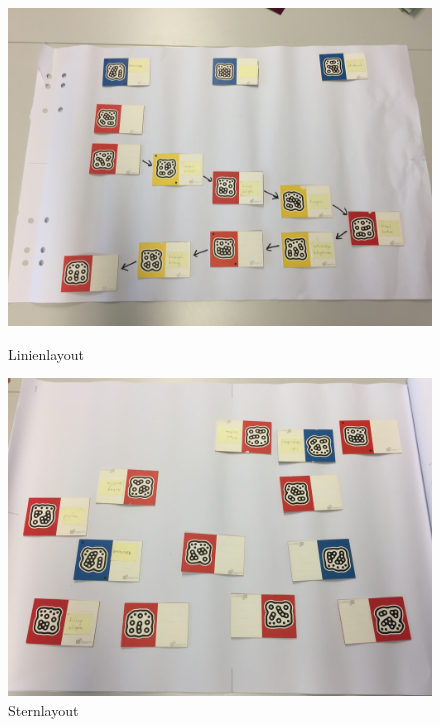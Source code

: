 \begin{figure}[h]
	\centering 
	\begin{minipage}[b]{0.45\textwidth} 
		\includegraphics[width=\textwidth]{figures/linienlegemethode.jpg}
		\caption{Linienlayout  \protect~\cite{max}} 
		\label{fig:linienlegemethode} 
	\end{minipage}
	\hfill 
	\begin{minipage}[b]{0.45\textwidth} 
		\includegraphics[width=\textwidth]{figures/sternlegemethode.jpg} 		\caption{Sternlayout 
		\protect~\cite{max}} 
		\label{fig:sternlegemethode} 
	\end{minipage}
\end{figure}

